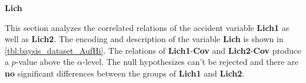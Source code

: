 \Large
\centerline{\textbf{Lich}}
\normalsize
This section analyzes the correlated relations of the accident variable \textbf{Lich1} as well as \textbf{Lich2}. The encoding and description of the variable \textbf{Lich} is shown in \cref{tbl:baysis_dataset_AufHi}. The relations of \textbf{Lich1}-\textbf{Cov} and  \textbf{Lich2}-\textbf{Cov} produce a $p$-value above the $\alpha$-level. The null hypothesizes can't be rejected and there are \textbf{no} significant differences between the groups of \textbf{Lich1} and \textbf{Lich2}.




